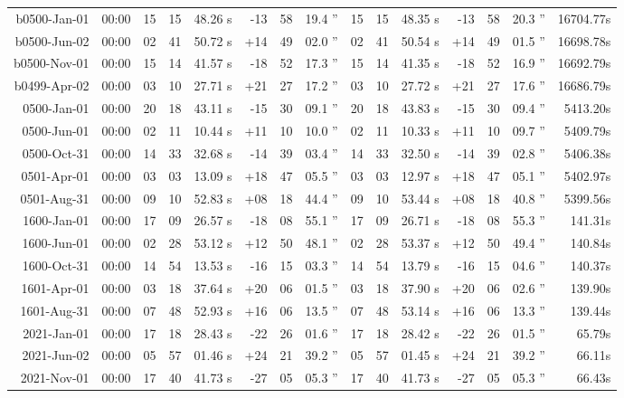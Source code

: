 \begin{longtable}{r@{\,}r|r@{h\,}r@{m\,}r<{s}|r@{°\,}r@{'\,}r<{''}||r@{h\,}r@{m\,}r<{s}|r@{°\,}r@{'\,}r<{''}r<{s}}
b0500-Jan-01 & 00:00  &   15 & 15 & 48.26 & -13 & 58 & 19.4 & 15&15&48.35 & -13&58&20.3 & 16704.77\\ %
b0500-Jun-02 & 00:00  &   02 & 41 & 50.72 & +14 & 49 & 02.0 & 02&41&50.54 & +14&49&01.5 & 16698.78\\ %
b0500-Nov-01 & 00:00  &   15 & 14 & 41.57 & -18 & 52 & 17.3 & 15&14&41.35 & -18&52&16.9 & 16692.79\\ %
b0499-Apr-02 & 00:00  &   03 & 10 & 27.71 & +21 & 27 & 17.2 & 03&10&27.72 & +21&27&17.6 & 16686.79\\ %
 0500-Jan-01 & 00:00  &   20 & 18 & 43.11 & -15 & 30 & 09.1 & 20&18&43.83 & -15&30&09.4 & 5413.20\\ %
 0500-Jun-01 & 00:00  &   02 & 11 & 10.44 & +11 & 10 & 10.0 & 02&11&10.33 & +11&10&09.7 & 5409.79\\ %
 0500-Oct-31 & 00:00  &   14 & 33 & 32.68 & -14 & 39 & 03.4 & 14&33&32.50 & -14&39&02.8 & 5406.38\\ %
 0501-Apr-01 & 00:00  &   03 & 03 & 13.09 & +18 & 47 & 05.5 & 03&03&12.97 & +18&47&05.1 & 5402.97\\ %
 0501-Aug-31 & 00:00  &   09 & 10 & 52.83 & +08 & 18 & 44.4 & 09&10&53.44 & +08&18&40.8 & 5399.56\\ %
 1600-Jan-01 & 00:00  &   17 & 09 & 26.57 & -18 & 08 & 55.1 & 17&09&26.71 & -18&08&55.3 & 141.31\\ %
 1600-Jun-01 & 00:00  &   02 & 28 & 53.12 & +12 & 50 & 48.1 & 02&28&53.37 & +12&50&49.4 & 140.84\\ %
 1600-Oct-31 & 00:00  &   14 & 54 & 13.53 & -16 & 15 & 03.3 & 14&54&13.79 & -16&15&04.6 & 140.37\\ %
 1601-Apr-01 & 00:00  &   03 & 18 & 37.64 & +20 & 06 & 01.5 & 03&18&37.90 & +20&06&02.6 & 139.90\\ %
 1601-Aug-31 & 00:00  &   07 & 48 & 52.93 & +16 & 06 & 13.5 & 07&48&53.14 & +16&06&13.3 & 139.44\\ %
 2021-Jan-01 & 00:00  &   17 & 18 & 28.43 & -22 & 26 & 01.6 & 17&18&28.42 & -22&26&01.5 & 65.79\\ %
 2021-Jun-02 & 00:00  &   05 & 57 & 01.46 & +24 & 21 & 39.2 & 05&57&01.45 & +24&21&39.2 & 66.11\\ %
 2021-Nov-01 & 00:00  &   17 & 40 & 41.73 & -27 & 05 & 05.3 & 17&40&41.73 & -27&05&05.3 & 66.43\\ %

\end{longtable}
